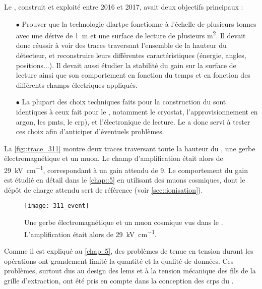       Le \TOO{}, construit et exploité entre 2016 et 2017, avait deux objectifs principaux :
      \begin{itemize}
        \item[$\bullet$] Prouver que la technologie \gls{dlartpc} fonctionne à l'échelle de plusieurs tonnes avec une dérive de \SI{1}{\meter} et une surface de lecture de plusieurs \si{\meter\squared}. Il devait donc réussir à voir des traces traversant l'ensemble de la hauteur du détecteur, et reconstruire leurs différentes caractéristiques (énergie, angles, positions...). Il devait aussi étudier la stabilité du gain sur la surface de lecture ainsi que son comportement en fonction du temps et en fonction des différents champs électriques appliqués.
        \item[$\bullet$] La plupart des choix techniques faits pour la construction du \TOO{} sont identiques à ceux fait pour le \SSS{}, notamment le cryostat, l'approvisionnement en argon, les \glspl{pmt}, le \gls{crp}), et l'électronique de lecture. Le \TOO{} a donc servi à tester ces choix afin d'anticiper d'éventuels problèmes.
      \end{itemize}
      
      La \autoref{fig::trace_311} montre deux traces traversant toute la hauteur du \TOO{}, une gerbe électromagnétique et un muon. Le champ d'amplification était alors de \SI{29}{\kilo\volt\per\centi\meter}, correspondant à un gain attendu de 9. Le comportement du gain est étudié en détail dans le \autoref{chap::5} en utilisant des muons cosmiques, dont le dépôt de charge attendu sert de référence (voir \autoref{sec::ionisation}).

      \begin{figure}[htbp]
        \centering
        \texttt{[image: 311\_event]}        
        \caption[Quelques événements vus dans le  \TOO{}.]{\label{fig::trace_311}Une gerbe électromagnétique et un muon cosmique vus dans le \TOO{}. L'amplification était alors de \SI{29}{\kilo\volt\per\centi\meter}.}
      \end{figure}

      Comme il est expliqué au \autoref{chap::5}, des problèmes de tenue en tension durant les opérations ont grandement limité la quantité et la qualité de données. Ces problèmes, surtout dus au design des \glspl{lem} et à la tension mécanique des fils de la grille d'extraction, ont été pris en compte dans la conception des \glspl{crp} du \SSS{}.

